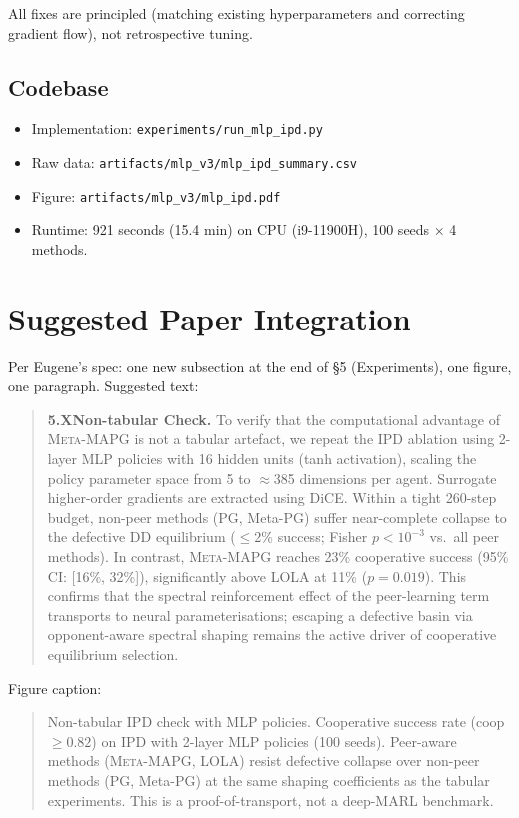 \documentclass[11pt,a4paper]{article}
\newcommand{\MAPG}{\textsc{Meta-MAPG}}
\begin{document}
All fixes are principled (matching existing hyperparameters and correcting gradient flow), not retrospective tuning.

\subsection{Codebase}

\begin{itemize}[nosep]
  \item Implementation: \texttt{experiments/run\_mlp\_ipd.py}
  \item Raw data: \texttt{artifacts/mlp\_v3/mlp\_ipd\_summary.csv}
  \item Figure: \texttt{artifacts/mlp\_v3/mlp\_ipd.pdf}
  \item Runtime: 921 seconds (15.4 min) on CPU (i9-11900H), 100 seeds $\times$ 4 methods.
\end{itemize}

\section{Suggested Paper Integration}

Per Eugene's spec: one new subsection at the end of \S5 (Experiments), one figure, one paragraph. Suggested text:

\begin{quote}
\textbf{5.X\quad Non-tabular Check.}
To verify that the computational advantage of \MAPG{} is not a tabular artefact, we repeat the IPD ablation using 2-layer MLP policies with 16 hidden units (tanh activation), scaling the policy parameter space from 5 to $\approx$385 dimensions per agent. Surrogate higher-order gradients are extracted using DiCE. Within a tight 260-step budget, non-peer methods (PG, Meta-PG) suffer near-complete collapse to the defective DD equilibrium ($\le$2\% success; Fisher $p < 10^{-3}$ vs.\ all peer methods). In contrast, \MAPG{} reaches 23\% cooperative success (95\% CI: [16\%, 32\%]), significantly above LOLA at 11\% ($p = 0.019$). This confirms that the spectral reinforcement effect of the peer-learning term transports to neural parameterisations; escaping a defective basin via opponent-aware spectral shaping remains the active driver of cooperative equilibrium selection.
\end{quote}

Figure caption:
\begin{quote}
Non-tabular IPD check with MLP policies. Cooperative success rate (coop $\ge 0.82$) on IPD with 2-layer MLP policies (100 seeds). Peer-aware methods (\MAPG{}, LOLA) resist defective collapse over non-peer methods (PG, Meta-PG) at the same shaping coefficients as the tabular experiments. This is a proof-of-transport, not a deep-MARL benchmark.
\end{quote}
\end{document}
